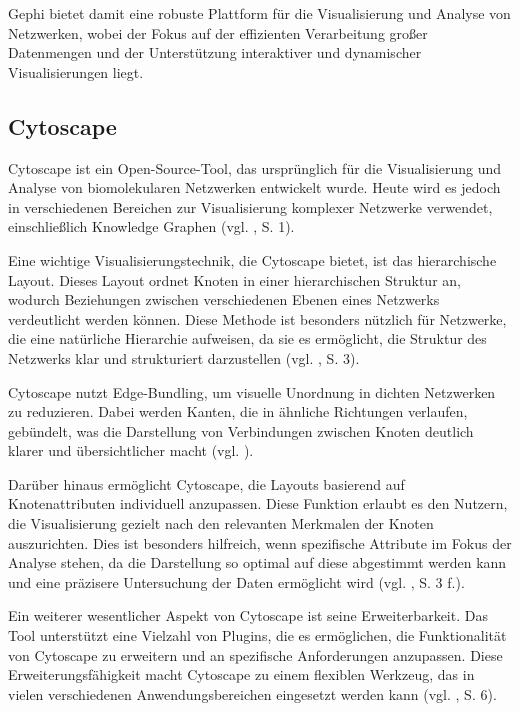 Gephi bietet damit eine robuste Plattform für die Visualisierung und Analyse von Netzwerken, wobei der Fokus auf der effizienten Verarbeitung großer Datenmengen und der Unterstützung interaktiver und dynamischer Visualisierungen liegt.

\subsection{Cytoscape}

Cytoscape ist ein Open-Source-Tool, das ursprünglich für die Visualisierung und Analyse von biomolekularen Netzwerken entwickelt wurde. Heute wird es jedoch in verschiedenen Bereichen zur Visualisierung komplexer Netzwerke verwendet, einschließlich Knowledge Graphen (vgl. \cite{cytoscape:Shannon}, S. 1).

Eine wichtige Visualisierungstechnik, die Cytoscape bietet, ist das hierarchische Layout. Dieses Layout ordnet Knoten in einer hierarchischen Struktur an, wodurch Beziehungen zwischen verschiedenen Ebenen eines Netzwerks verdeutlicht werden können. Diese Methode ist besonders nützlich für Netzwerke, die eine natürliche Hierarchie aufweisen, da sie es ermöglicht, die Struktur des Netzwerks klar und strukturiert darzustellen (vgl. \cite{cytoscape:Shannon}, S. 3).

Cytoscape nutzt Edge-Bundling, um visuelle Unordnung in dichten Netzwerken zu reduzieren. Dabei werden Kanten, die in ähnliche Richtungen verlaufen, gebündelt, was die Darstellung von Verbindungen zwischen Knoten deutlich klarer und übersichtlicher macht (vgl. \cite{cytoscapeLayout:Cytoscape}).

Darüber hinaus ermöglicht Cytoscape, die Layouts basierend auf Knotenattributen individuell anzupassen. Diese Funktion erlaubt es den Nutzern, die Visualisierung gezielt nach den relevanten Merkmalen der Knoten auszurichten. Dies ist besonders hilfreich, wenn spezifische Attribute im Fokus der Analyse stehen, da die Darstellung so optimal auf diese abgestimmt werden kann und eine präzisere Untersuchung der Daten ermöglicht wird (vgl. \cite{cytoscape:Shannon}, S. 3 f.).

Ein weiterer wesentlicher Aspekt von Cytoscape ist seine Erweiterbarkeit. Das Tool unterstützt eine Vielzahl von Plugins, die es ermöglichen, die Funktionalität von Cytoscape zu erweitern und an spezifische Anforderungen anzupassen. Diese Erweiterungsfähigkeit macht Cytoscape zu einem flexiblen Werkzeug, das in vielen verschiedenen Anwendungsbereichen eingesetzt werden kann (vgl. \cite{cytoscape:Shannon}, S. 6).


